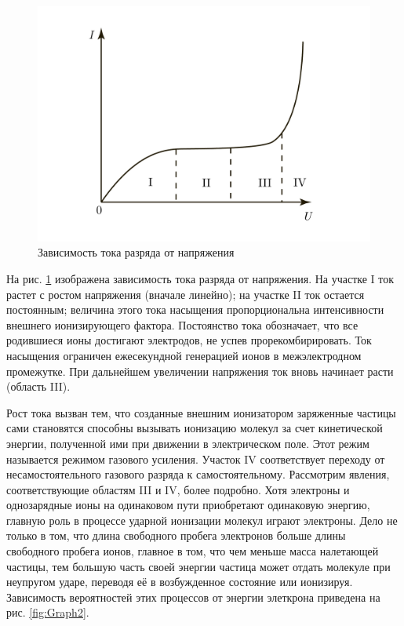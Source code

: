 \documentclass[a4paper, 12pt]{article}
\begin{document}
\begin{figure}[h]
\centering
\includegraphics[scale=0.5]{Graph1.pdf}
\caption{Зависимость тока разряда от напряжения}
\label{fig:Graph1}
\end{figure}
На рис. \ref{fig:Graph1} изображена зависимость тока разряда от напряжения. На участке I ток растет с ростом напряжения (вначале линейно); на участке II ток остается постоянным; величина этого тока насыщения пропорциональна интенсивности внешнего ионизирующего фактора. Постоянство тока обозначает, что все родившиеся ионы достигают электродов, не успев прорекомбирировать. Ток насыщения ограничен ежесекундной генерацией ионов в межэлектродном промежутке. При дальнейшем увеличении напряжения ток вновь начинает расти (область III).\par
Рост тока вызван тем, что созданные внешним ионизатором заряженные частицы сами становятся способны вызывать ионизацию молекул за счет кинетической энергии, полученной ими при движении в электрическом поле. Этот режим называется режимом газового усиления. Участок IV соответствует переходу от несамостоятельного газового разряда к самостоятельному. Рассмотрим явления, соответствующие областям III и IV, более подробно. Хотя электроны и однозарядные ионы на одинаковом пути приобретают одинаковую энергию, главную роль в процессе ударной ионизации молекул играют электроны. Дело не только в том, что длина свободного пробега электронов больше длины свободного пробега ионов, главное в том, что чем меньше масса налетающей частицы, тем большую часть своей энергии частица может отдать молекуле при неупругом ударе, переводя её в возбужденное состояние или ионизируя. Зависимость вероятностей этих процессов от энергии элеткрона приведена на рис. \ref{fig:Graph2}.\par
\end{document}
